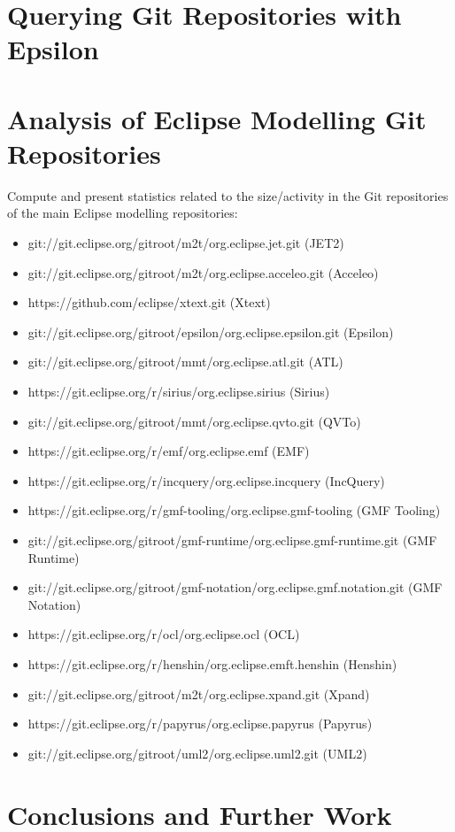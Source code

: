 \documentclass[runningheads,a4paper]{llncs}
\begin{document}
\section{Querying Git Repositories with Epsilon}

\section{Analysis of Eclipse Modelling Git Repositories}
Compute and present statistics related to the size/activity in the Git repositories of the main Eclipse modelling repositories:

\begin{itemize}
  \item git://git.eclipse.org/gitroot/m2t/org.eclipse.jet.git (JET2)
  \item git://git.eclipse.org/gitroot/m2t/org.eclipse.acceleo.git (Acceleo)
  \item https://github.com/eclipse/xtext.git (Xtext)
  \item git://git.eclipse.org/gitroot/epsilon/org.eclipse.epsilon.git (Epsilon)
  \item git://git.eclipse.org/gitroot/mmt/org.eclipse.atl.git (ATL)
  \item https://git.eclipse.org/r/sirius/org.eclipse.sirius (Sirius)
  \item git://git.eclipse.org/gitroot/mmt/org.eclipse.qvto.git (QVTo)
  \item https://git.eclipse.org/r/emf/org.eclipse.emf (EMF)
  \item https://git.eclipse.org/r/incquery/org.eclipse.incquery (IncQuery)
  \item https://git.eclipse.org/r/gmf-tooling/org.eclipse.gmf-tooling (GMF Tooling)
  \item git://git.eclipse.org/gitroot/gmf-runtime/org.eclipse.gmf-runtime.git (GMF Runtime)
  \item git://git.eclipse.org/gitroot/gmf-notation/org.eclipse.gmf.notation.git  (GMF Notation)
  \item https://git.eclipse.org/r/ocl/org.eclipse.ocl (OCL)
  \item https://git.eclipse.org/r/henshin/org.eclipse.emft.henshin (Henshin)
  \item git://git.eclipse.org/gitroot/m2t/org.eclipse.xpand.git (Xpand)
  \item https://git.eclipse.org/r/papyrus/org.eclipse.papyrus (Papyrus)
  \item git://git.eclipse.org/gitroot/uml2/org.eclipse.uml2.git (UML2)
\end{itemize}

\section{Conclusions and Further Work}




\end{document}

